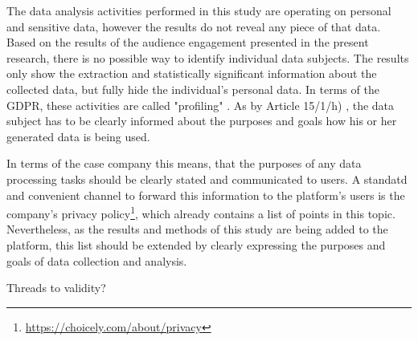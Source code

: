 The data analysis activities performed in this study are operating on personal and sensitive data, however the results do not reveal any piece of that data. Based on the results of the audience engagement presented in the present research, there is no possible way to identify individual data subjects. The results only show the extraction and statistically significant information about the collected data, but fully hide the individual's personal data. In terms of the GDPR, these activities are called "profiling" \cite{gdpr}. As by Article 15/1/h) \cite{gdpr}, the data subject has to be clearly informed about the purposes and goals how his or her generated data is being used. 

In terms of the case company this means, that the purposes of any data processing tasks should be clearly stated and communicated to users. A standatd and convenient channel to forward this information to the platform's users is the company's privacy policy\footnote{\url{https://choicely.com/about/privacy}}, which already contains a list of points in this topic. Nevertheless, as the results and methods of this study are being added to the platform, this list should be extended by clearly expressing the purposes and goals of data collection and analysis.

Threads to validity? 

